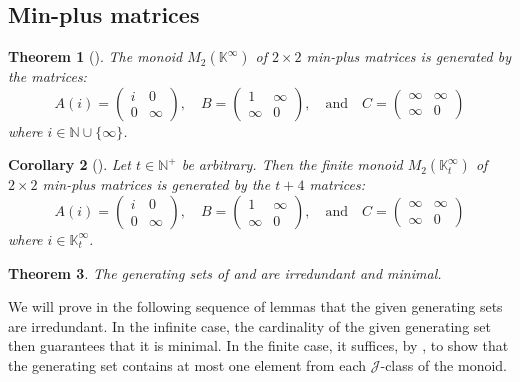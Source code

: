 \documentclass[11pt]{article}
\newtheorem{thm}{Theorem}[subsection]
\newtheorem{cor}[thm]{Corollary}
\numberwithin{equation}{section}
\newcommand{\J}{\mathscr{J}}
\newcommand{\N}{\mathbb{N}}
\newcommand{\Np}{\N^{+}}
\newcommand{\K}{\mathbb{K}}
\newcommand{\Kmin}{\K^{\infty}}
\newcommand{\Kmint}{\K^{\infty}_t}
\newcommand{\mat}[4]{\begin{pmatrix}#1&#2\\#3&#4\end{pmatrix}}
\begin{document}
\subsection{Min-plus matrices}

\begin{thm}[{\cite[Theorem 1.1]{East2020aa}}]
  The monoid $M_{2}(\Kmin)$ of $2 \times 2$ min-plus matrices is
  generated by the matrices:
  \begin{equation*}
          A(i) = \mat{i}{0}{0}{\infty},
    \quad B     = \mat{1}{\infty}{\infty}{0},
    \quad \text{and}
    \quad C     =  \mat{\infty}{\infty}{\infty}{0}
  \end{equation*}
  where $i \in \N \cup \{\infty\}$.
\end{thm}

\begin{cor}[{\cite[Corollary 1.2]{East2020aa}}]
  Let $t \in \Np$ be arbitrary. Then the finite monoid $M_{2}(\Kmint)$ of
  $2 \times 2$ min-plus matrices is generated by the $t + 4$ matrices:
  \begin{equation*}
          A(i) = \mat{i}{0}{0}{\infty},
    \quad B     = \mat{1}{\infty}{\infty}{0},
    \quad \text{and}
    \quad C     =  \mat{\infty}{\infty}{\infty}{0}
  \end{equation*}
  where $i \in \Kmint$.
\end{cor}

\begin{thm}
  The generating sets of  and
   are irredundant and minimal.
\end{thm}
We will prove in the following sequence of lemmas that the given generating sets
are irredundant. In the infinite case, the cardinality of the given generating
set then guarantees that it is minimal. In the finite case, it suffices, by
, to show that the generating set contains at most one element
from each $\J$-class of the monoid. 
\end{document}
